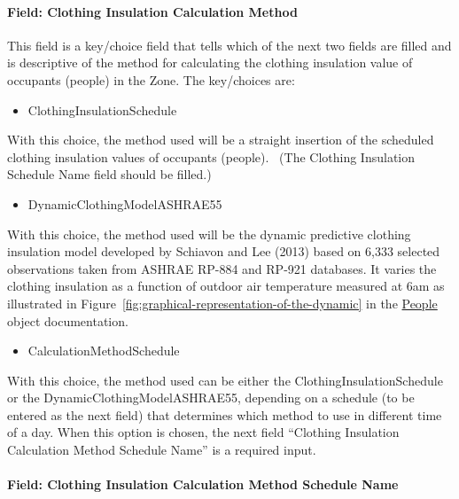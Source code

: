 \paragraph{Field: Clothing Insulation Calculation Method}\label{field-clothing-insulation-calculation-method-people-instance}

This field is a key/choice field that tells which of the next two fields are filled and is descriptive of the method for calculating the clothing insulation value of occupants (people) in the Zone. The key/choices are:

\begin{itemize}
\tightlist
\item
  ClothingInsulationSchedule
\end{itemize}

With this choice, the method used will be a straight insertion of the scheduled clothing insulation values of occupants (people).~ (The Clothing Insulation Schedule Name field should be filled.)

\begin{itemize}
\tightlist
\item
  DynamicClothingModelASHRAE55
\end{itemize}

With this choice, the method used will be the dynamic predictive clothing insulation model developed by Schiavon and Lee (2013) based on 6,333 selected observations taken from ASHRAE RP-884 and RP-921 databases. It varies the clothing insulation as a function of outdoor air temperature measured at 6am as illustrated in Figure~\ref{fig:graphical-representation-of-the-dynamic} in the \hyperref[people]{People} object documentation.

\begin{itemize}
\tightlist
\item
  CalculationMethodSchedule
\end{itemize}

With this choice, the method used can be either the ClothingInsulationSchedule or the DynamicClothingModelASHRAE55, depending on a schedule (to be entered as the next field) that determines which method to use in different time of a day. When this option is chosen, the next field ``Clothing Insulation Calculation Method Schedule Name'' is a required input.


\paragraph{Field: Clothing Insulation Calculation Method Schedule Name}\label{field-clothing-insulation-calculation-method-schedule-name-people-instance}

